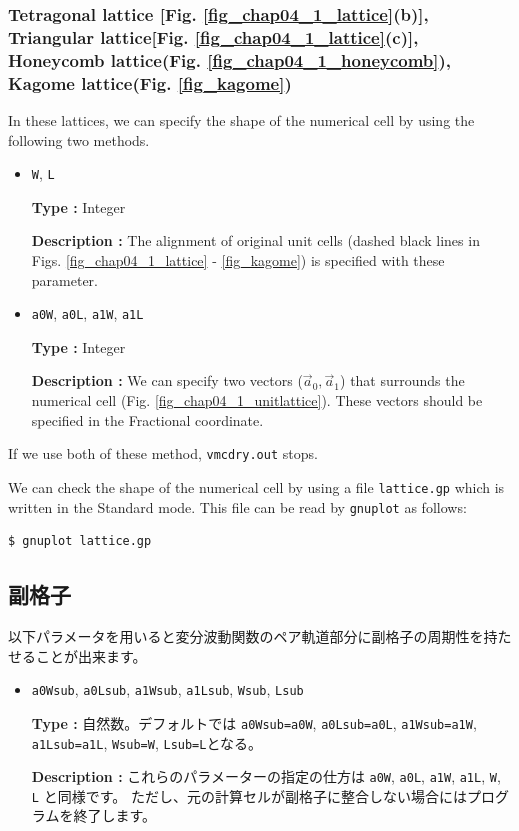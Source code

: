 \subsubsection{Tetragonal lattice [Fig. \ref{fig_chap04_1_lattice}(b)], 
Triangular lattice[Fig. \ref{fig_chap04_1_lattice}(c)],
Honeycomb lattice(Fig. \ref{fig_chap04_1_honeycomb}),
Kagome lattice(Fig. \ref{fig_kagome})}

In these lattices,
we can specify the shape of the numerical cell by using the following two methods.

\begin{itemize}

\item \verb|W|, \verb|L|

{\bf Type :} Integer

{\bf Description :} The alignment of original unit cells 
(dashed black lines in Figs. \ref{fig_chap04_1_lattice} - \ref{fig_kagome})
is specified with these parameter.

\item \verb|a0W|, \verb|a0L|, \verb|a1W|, \verb|a1L|

{\bf Type :} Integer

{\bf Description :} 
We can specify two vectors (${\vec a}_0, {\vec a}_1$)
that surrounds the numerical cell (Fig. \ref{fig_chap04_1_unitlattice}).
These vectors should be specified in the Fractional coordinate.

\end{itemize}

If we use both of these method, \verb|vmcdry.out| stops.

We can check the shape of the numerical cell
by using a file \verb|lattice.gp|
which is written in the Standard mode.
This file can be read by \verb|gnuplot| as follows:
\begin{verbatim}
$ gnuplot lattice.gp
\end{verbatim}

\subsection{副格子}

以下パラメータを用いると変分波動関数のペア軌道部分に副格子の周期性を持たせることが出来ます。

\begin{itemize}

\item \verb|a0Wsub|, \verb|a0Lsub|, \verb|a1Wsub|, \verb|a1Lsub|, \verb|Wsub|, \verb|Lsub|

{\bf Type :} 自然数。デフォルトでは
\verb|a0Wsub=a0W|, \verb|a0Lsub=a0L|, \verb|a1Wsub=a1W|, \verb|a1Lsub=a1L|, 
\verb|Wsub=W|, \verb|Lsub=L|となる。

{\bf Description :} これらのパラメーターの指定の仕方は
\verb|a0W|, \verb|a0L|, \verb|a1W|, \verb|a1L|, \verb|W|, \verb|L|
と同様です。
ただし、元の計算セルが副格子に整合しない場合にはプログラムを終了します。

\end{itemize}


